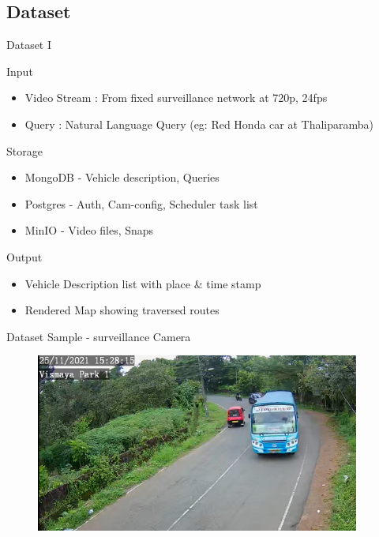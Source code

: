 \documentclass{beamer}
\begin{document}
\subsection{Dataset}
\begin{frame}{Dataset I}
	\begin{block}{Input}
		\begin{itemize}
			\item Video Stream : From fixed surveillance network at 720p, 24fps
			\item Query : Natural Language Query (eg: Red Honda car at Thaliparamba)
		\end{itemize}
	\end{block}

	\begin{block}{Storage}
		\begin{itemize}
			\item MongoDB - Vehicle description, Queries
			\item Postgres - Auth, Cam-config, Scheduler task list
			\item MinIO - Video files, Snaps
		\end{itemize}	
	\end{block}

	\begin{block}{Output}
		\begin{itemize}
			\item Vehicle Description list with place \& time stamp
			\item Rendered Map showing traversed routes
		\end{itemize}
	\end{block}
\end{frame}

\begin{frame}[allowframebreaks]{Dataset Sample - surveillance Camera}
	\begin{figure}
		\includegraphics[width=0.95\textwidth]{res/dataset_sample.png}
	\end{figure}
\end{frame}
\end{document}
